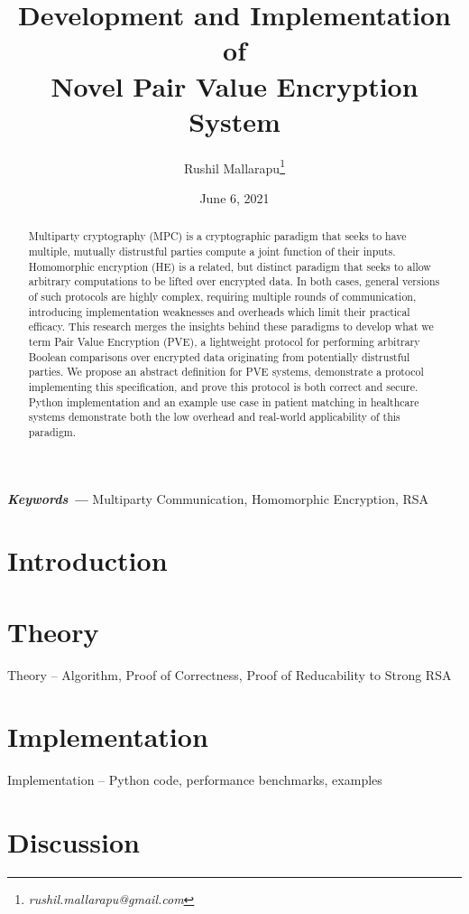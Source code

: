 \documentclass{article}
\title{Development and Implementation of\\Novel Pair Value Encryption System}
\author{Rushil Mallarapu\footnote{\textit{rushil.mallarapu@gmail.com}}}
\date{June 6, 2021}
\providecommand{\keywords}[1]
{
  \small    
  \textbf{\textit{Keywords ---}} #1
}
\begin{document}
\maketitle

\begin{abstract}
    Multiparty cryptography (MPC) is a cryptographic paradigm that seeks to have multiple, mutually distrustful parties compute a joint function of their inputs. Homomorphic encryption (HE) is a related, but distinct paradigm that seeks to allow arbitrary computations to be lifted over encrypted data. In both cases, general versions of such protocols are highly complex, requiring multiple rounds of communication, introducing implementation weaknesses and overheads which limit their practical efficacy. This research merges the insights behind these paradigms to develop what we term Pair Value Encryption (PVE), a lightweight protocol for performing arbitrary Boolean comparisons over encrypted data originating from potentially distrustful parties. We propose an abstract definition for PVE systems, demonstrate a protocol implementing this specification, and prove this protocol is both correct and secure. Python implementation and an example use case in patient matching in healthcare systems demonstrate both the low overhead and real-world applicability of this paradigm.
\end{abstract}

\keywords{Multiparty Communication, Homomorphic Encryption, RSA}

\section{Introduction}



\section{Theory}

Theory – Algorithm, Proof of Correctness, Proof of Reducability to Strong RSA

\section{Implementation}

Implementation – Python code, performance benchmarks, examples

\section{Discussion}
\end{document}
